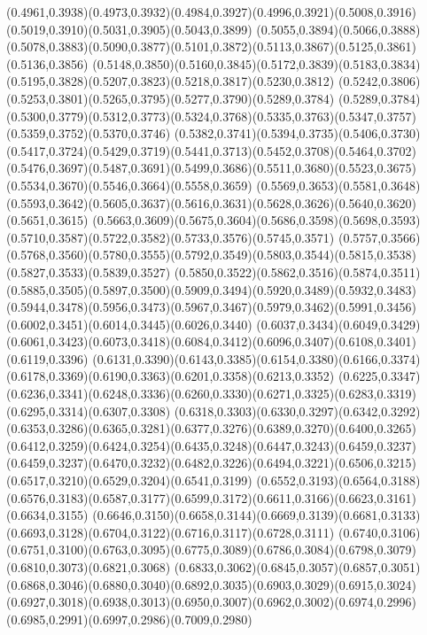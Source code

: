 (0.4961,0.3938)(0.4973,0.3932)(0.4984,0.3927)(0.4996,0.3921)(0.5008,0.3916)(0.5019,0.3910)(0.5031,0.3905)(0.5043,0.3899)
(0.5055,0.3894)(0.5066,0.3888)(0.5078,0.3883)(0.5090,0.3877)(0.5101,0.3872)(0.5113,0.3867)(0.5125,0.3861)(0.5136,0.3856)
(0.5148,0.3850)(0.5160,0.3845)(0.5172,0.3839)(0.5183,0.3834)(0.5195,0.3828)(0.5207,0.3823)(0.5218,0.3817)(0.5230,0.3812)
(0.5242,0.3806)(0.5253,0.3801)(0.5265,0.3795)(0.5277,0.3790)(0.5289,0.3784)
\PST@Solid(0.5289,0.3784)(0.5300,0.3779)(0.5312,0.3773)(0.5324,0.3768)(0.5335,0.3763)(0.5347,0.3757)(0.5359,0.3752)(0.5370,0.3746)
(0.5382,0.3741)(0.5394,0.3735)(0.5406,0.3730)(0.5417,0.3724)(0.5429,0.3719)(0.5441,0.3713)(0.5452,0.3708)(0.5464,0.3702)
(0.5476,0.3697)(0.5487,0.3691)(0.5499,0.3686)(0.5511,0.3680)(0.5523,0.3675)(0.5534,0.3670)(0.5546,0.3664)(0.5558,0.3659)
(0.5569,0.3653)(0.5581,0.3648)(0.5593,0.3642)(0.5605,0.3637)(0.5616,0.3631)(0.5628,0.3626)(0.5640,0.3620)(0.5651,0.3615)
(0.5663,0.3609)(0.5675,0.3604)(0.5686,0.3598)(0.5698,0.3593)(0.5710,0.3587)(0.5722,0.3582)(0.5733,0.3576)(0.5745,0.3571)
(0.5757,0.3566)(0.5768,0.3560)(0.5780,0.3555)(0.5792,0.3549)(0.5803,0.3544)(0.5815,0.3538)(0.5827,0.3533)(0.5839,0.3527)
(0.5850,0.3522)(0.5862,0.3516)(0.5874,0.3511)(0.5885,0.3505)(0.5897,0.3500)(0.5909,0.3494)(0.5920,0.3489)(0.5932,0.3483)
(0.5944,0.3478)(0.5956,0.3473)(0.5967,0.3467)(0.5979,0.3462)(0.5991,0.3456)(0.6002,0.3451)(0.6014,0.3445)(0.6026,0.3440)
(0.6037,0.3434)(0.6049,0.3429)(0.6061,0.3423)(0.6073,0.3418)(0.6084,0.3412)(0.6096,0.3407)(0.6108,0.3401)(0.6119,0.3396)
(0.6131,0.3390)(0.6143,0.3385)(0.6154,0.3380)(0.6166,0.3374)(0.6178,0.3369)(0.6190,0.3363)(0.6201,0.3358)(0.6213,0.3352)
(0.6225,0.3347)(0.6236,0.3341)(0.6248,0.3336)(0.6260,0.3330)(0.6271,0.3325)(0.6283,0.3319)(0.6295,0.3314)(0.6307,0.3308)
(0.6318,0.3303)(0.6330,0.3297)(0.6342,0.3292)(0.6353,0.3286)(0.6365,0.3281)(0.6377,0.3276)(0.6389,0.3270)(0.6400,0.3265)
(0.6412,0.3259)(0.6424,0.3254)(0.6435,0.3248)(0.6447,0.3243)(0.6459,0.3237)
\PST@Solid(0.6459,0.3237)(0.6470,0.3232)(0.6482,0.3226)(0.6494,0.3221)(0.6506,0.3215)(0.6517,0.3210)(0.6529,0.3204)(0.6541,0.3199)
(0.6552,0.3193)(0.6564,0.3188)(0.6576,0.3183)(0.6587,0.3177)(0.6599,0.3172)(0.6611,0.3166)(0.6623,0.3161)(0.6634,0.3155)
(0.6646,0.3150)(0.6658,0.3144)(0.6669,0.3139)(0.6681,0.3133)(0.6693,0.3128)(0.6704,0.3122)(0.6716,0.3117)(0.6728,0.3111)
(0.6740,0.3106)(0.6751,0.3100)(0.6763,0.3095)(0.6775,0.3089)(0.6786,0.3084)(0.6798,0.3079)(0.6810,0.3073)(0.6821,0.3068)
(0.6833,0.3062)(0.6845,0.3057)(0.6857,0.3051)(0.6868,0.3046)(0.6880,0.3040)(0.6892,0.3035)(0.6903,0.3029)(0.6915,0.3024)
(0.6927,0.3018)(0.6938,0.3013)(0.6950,0.3007)(0.6962,0.3002)(0.6974,0.2996)(0.6985,0.2991)(0.6997,0.2986)(0.7009,0.2980)

